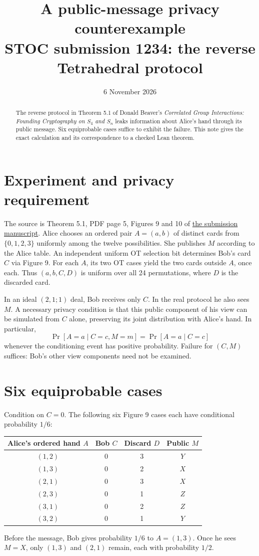 \documentclass[10pt,a4paper]{article}
\title{A public-message privacy counterexample\\\large STOC submission 1234: the reverse Tetrahedral protocol}
\author{}
\date{6 November 2026}
\newcommand{\Prb}{\mathop{\mathrm{Pr}}}
\begin{document}
\maketitle
\begin{abstract}
The reverse protocol in Theorem 5.1 of Donald Beaver's \emph{Correlated Group Interactions: Founding Cryptography on $S_4$ and $S_n$} leaks information about Alice's hand through its public message. Six equiprobable cases suffice to exhibit the failure. This note gives the exact calculation and its correspondence to a checked Lean theorem.
\end{abstract}
\section{Experiment and privacy requirement}
The source is Theorem 5.1, PDF page 5, Figures 9 and 10 of \href{https://github.com/sigact-stoc/stoc2027/releases/download/papers-2/1234.pdf}{the submission manuscript}. Alice chooses an ordered pair $A=(a,b)$ of distinct cards from $\{0,1,2,3\}$ uniformly among the twelve possibilities. She publishes $M$ according to the Alice table. An independent uniform OT selection bit determines Bob's card $C$ via Figure 9. For each $A$, its two OT cases yield the two cards outside $A$, once each. Thus $(a,b,C,D)$ is uniform over all 24 permutations, where $D$ is the discarded card.

In an ideal $(2,1;1)$ deal, Bob receives only $C$. In the real protocol he also sees $M$. A necessary privacy condition is that this public component of his view can be simulated from $C$ alone, preserving its joint distribution with Alice's hand. In particular,
$$
 \Prb[A=a\mid C=c,M=m]=\Prb[A=a\mid C=c]
$$
whenever the conditioning event has positive probability. Failure for $(C,M)$ suffices: Bob's other view components need not be examined.
\section{Six equiprobable cases}
Condition on $C=0$. The following six Figure 9 cases each have conditional probability $1/6$:
\begin{center}
\begin{tabular}{cccc}
\toprule Alice's ordered hand $A$ & Bob $C$ & Discard $D$ & Public $M$\\\midrule
$(1,2)$ & 0 & 3 & $Y$\\
$(1,3)$ & 0 & 2 & $X$\\
$(2,1)$ & 0 & 3 & $X$\\
$(2,3)$ & 0 & 1 & $Z$\\
$(3,1)$ & 0 & 2 & $Z$\\
$(3,2)$ & 0 & 1 & $Y$\\\bottomrule
\end{tabular}
\end{center}
Before the message, Bob gives probability $1/6$ to $A=(1,3)$. Once he sees $M=X$, only $(1,3)$ and $(2,1)$ remain, each with probability $1/2$.
\newpage
\end{document}
